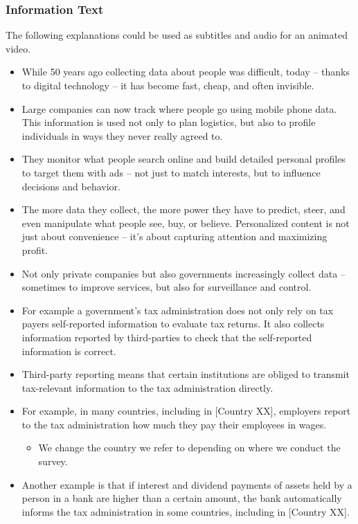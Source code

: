 \documentclass[11pt]{article}
\begin{document}
\subsubsection*{Information Text}
The following explanations could be used as subtitles and audio for an animated video.
\begin{itemize}
    \item While 50 years ago collecting data about people was difficult, today – thanks to digital technology – it has become fast, cheap, and often invisible.
    \item Large companies can now track where people go using mobile phone data. This information is used not only to plan logistics, but also to profile individuals in ways they never really agreed to.
    \item They monitor what people search online and build detailed personal profiles to target them with ads – not just to match interests, but to influence decisions and behavior.
    \item The more data they collect, the more power they have to predict, steer, and even manipulate what people see, buy, or believe. Personalized content is not just about convenience – it’s about capturing attention and maximizing profit.
    \item Not only private companies but also governments increasingly collect data – sometimes to improve services, but also for surveillance and control.
    \item For example a government's tax administration does not only rely on tax payers self-reported information to evaluate tax returns. It also collects information reported by third-parties to check that the self-reported information is correct. 
    \item Third-party reporting means that certain institutions are obliged to transmit tax-relevant information to the tax administration directly.
    \item For example, in many countries, including in [Country XX], employers report to the tax administration how much they pay their employees in wages.
    \begin{itemize}
        \item We change the country we refer to depending on where we conduct the survey. 
    \end{itemize}
    \item Another example is that if interest and dividend payments of assets held by a person in a bank are higher than a certain amount, the bank automatically informs the tax administration in some countries, including in [Country XX]. 

\end{itemize}
\end{document}
